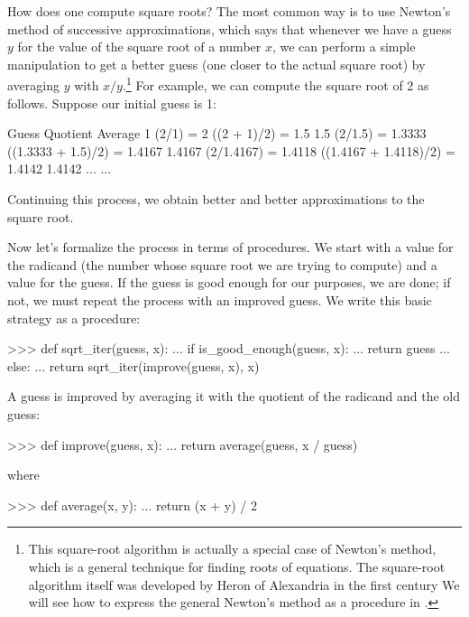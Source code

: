 How does one compute square roots?  The most common way is to use Newton's
method of successive approximations, which says that whenever we have a guess
\( y \) for the value of the square root of a number \( x \), we can perform a
simple manipulation to get a better guess (one closer to the actual square
root) by averaging \( y \) with \( x / y \).\footnote{This square-root algorithm
is actually a special case of Newton's method, which is a general technique for
finding roots of equations.  The square-root algorithm itself was developed by
Heron of Alexandria in the first century   We will see how to
express the general Newton's method as a procedure in .}
For example, we can compute the square root of 2 as follows.
Suppose our initial guess is 1:

\begin{compactExample}
Guess       Quotient                 Average
1           (2/1) = 2                ((2 + 1)/2) = 1.5
1.5         (2/1.5) = 1.3333         ((1.3333 + 1.5)/2) = 1.4167
1.4167      (2/1.4167) = 1.4118      ((1.4167 + 1.4118)/2) = 1.4142
1.4142      ...                      ...
\end{compactExample}

\noindent
Continuing this process, we obtain better and better approximations to the
square root.

Now let's formalize the process in terms of procedures.  We start with a value
for the radicand (the number whose square root we are trying to compute) and a
value for the guess.  If the guess is good enough for our purposes, we are
done; if not, we must repeat the process with an improved guess.  We write this
basic strategy as a procedure:

\begin{codeBlock}
>>> def sqrt_iter(guess, x):
...     if is_good_enough(guess, x):
...         return guess
...     else:
...         return sqrt_iter(improve(guess, x), x)
\end{codeBlock}

\noindent
A guess is improved by averaging it with the quotient of the radicand and the
old guess:

\begin{codeBlock}
>>> def improve(guess, x):
...     return average(guess, x / guess)
\end{codeBlock}

\noindent
where

\begin{codeBlock}
>>> def average(x, y):
...     return (x + y) / 2
\end{codeBlock}

